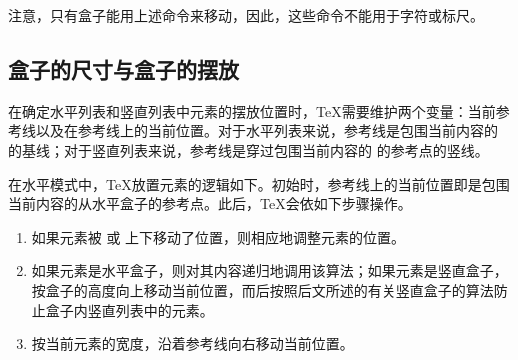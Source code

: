 \documentclass{book}
\begin{document}
注意，只有盒子能用上述命令来移动，因此，这些命令不能用于字符或标尺。

\subsection{盒子的尺寸与盒子的摆放}

在确定水平列表和竖直列表中元素的摆放位置时，\TeX 需要维护两个变量：当前参考线以及在参考线上的当前位置。对于水平列表来说，参考线是包围当前内容的  的基线；对于竖直列表来说，参考线是穿过包围当前内容的  的参考点的竖线。

在水平模式中，\TeX 放置元素的逻辑如下。初始时，参考线上的当前位置即是包围当前内容的从水平盒子的参考点。此后，\TeX 会依如下步骤操作。
\begin{enumerate}
\item 如果元素被  或  上下移动了位置，则相应地调整元素的位置。
\item 如果元素是水平盒子，则对其内容递归地调用该算法；如果元素是竖直盒子，按盒子的高度向上移动当前位置，而后按照后文所述的有关竖直盒子的算法防止盒子内竖直列表中的元素。
\item 按当前元素的宽度，沿着参考线向右移动当前位置。
\end{enumerate}
\end{document}
